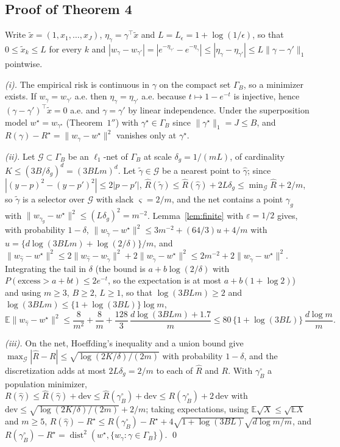 \documentclass[12pt]{article}
\newcommand{\E}{\mathbb{E}}
\newcommand{\calG}{\mathcal{G}}
\newcommand{\dist}{\operatorname{dist}}
\newcommand{\norm}[1]{\|#1\|}
\newcommand{\wstar}{w^{\star}}
\begin{document}
\subsection*{Proof of Theorem 4}
Write $\tilde x=(1,x_1,\dots,x_J)$, $\eta_\gamma=\gamma^{\top}\tilde x$ and $L=L_\epsilon=1+\log(1/\epsilon)$, so that $0\le\tilde x_k\le L$ for every $k$ and $|w_\gamma-w_{\gamma'}|=|e^{-\eta_{\gamma'}}-e^{-\eta_\gamma}|\le|\eta_\gamma-\eta_{\gamma'}|\le L\norm{\gamma-\gamma'}_1$ pointwise.

\emph{(i).} The empirical risk is continuous in $\gamma$ on the compact set $\Gamma_B$, so a minimizer exists. If $w_\gamma=w_{\gamma'}$ a.e. then $\eta_\gamma=\eta_{\gamma'}$ a.e. because $t\mapsto1-e^{-t}$ is injective, hence $(\gamma-\gamma')^{\top}\tilde x=0$ a.e. and $\gamma=\gamma'$ by linear independence. Under the superposition model $\wstar=w_{\gamma^\star}$ (Theorem~$1''$) with $\gamma^\star\in\Gamma_B$ since $\norm{\gamma^\star}_1=J\le B$, and $R(\gamma)-R^\star=\norm{w_\gamma-\wstar}^2$ vanishes only at $\gamma^\star$.

\emph{(ii).} Let $\calG\subset\Gamma_B$ be an $\ell_1$-net of $\Gamma_B$ at scale $\delta_g=1/(mL)$, of cardinality $K\le(3B/\delta_g)^d=(3BLm)^d$. Let $\tilde\gamma\in\calG$ be a nearest point to $\hat\gamma$; since $|(y-p)^2-(y-p')^2|\le2|p-p'|$, $\hat R(\tilde\gamma)\le\hat R(\hat\gamma)+2L\delta_g\le\min_{\calG}\hat R+2/m$, so $\tilde\gamma$ is a selector over $\calG$ with slack $\varsigma=2/m$, and the net contains a point $\gamma_g$ with $\norm{w_{\gamma_g}-\wstar}^2\le(L\delta_g)^2=m^{-2}$. Lemma~\ref{lem:finite} with $\varepsilon=1/2$ gives, with probability $1-\delta$, $\norm{w_{\tilde\gamma}-\wstar}^2\le3m^{-2}+(64/3)u+4/m$ with $u=\{d\log(3BLm)+\log(2/\delta)\}/m$, and $\norm{w_{\hat\gamma}-\wstar}^2\le2\norm{w_{\hat\gamma}-w_{\tilde\gamma}}^2+2\norm{w_{\tilde\gamma}-\wstar}^2\le2m^{-2}+2\norm{w_{\tilde\gamma}-\wstar}^2$. Integrating the tail in $\delta$ (the bound is $a+b\log(2/\delta)$ with $P(\text{excess}>a+bt)\le2e^{-t}$, so the expectation is at most $a+b(1+\log2)$) and using $m\ge3$, $B\ge2$, $L\ge1$, so that $\log(3BLm)\ge2$ and $\log(3BLm)\le\{1+\log(3BL)\}\log m$,
\[
\E\norm{w_{\hat\gamma}-\wstar}^2\le\frac{8}{m^2}+\frac8m+\frac{128}{3}\,\frac{d\log(3BLm)+1.7}{m}\le80\,\{1+\log(3BL)\}\,\frac{d\log m}{m}.
\]

\emph{(iii).} On the net, Hoeffding's inequality and a union bound give $\max_{\calG}|\hat R-R|\le\sqrt{\log(2K/\delta)/(2m)}$ with probability $1-\delta$, and the discretization adds at most $2L\delta_g=2/m$ to each of $\hat R$ and $R$. With $\gamma^{\circ}_B$ a population minimizer, $R(\hat\gamma)\le\hat R(\hat\gamma)+\text{dev}\le\hat R(\gamma^{\circ}_B)+\text{dev}\le R(\gamma^{\circ}_B)+2\,\text{dev}$ with $\text{dev}\le\sqrt{\log(2K/\delta)/(2m)}+2/m$; taking expectations, using $\E\sqrt X\le\sqrt{\E X}$ and $m\ge5$, $R(\hat\gamma)-R^\star\le R(\gamma^{\circ}_B)-R^\star+4\sqrt{1+\log(3BL)}\sqrt{d\log m/m}$, and $R(\gamma^{\circ}_B)-R^\star=\dist^2(\wstar,\{w_\gamma:\gamma\in\Gamma_B\})$. \qed
\end{document}
